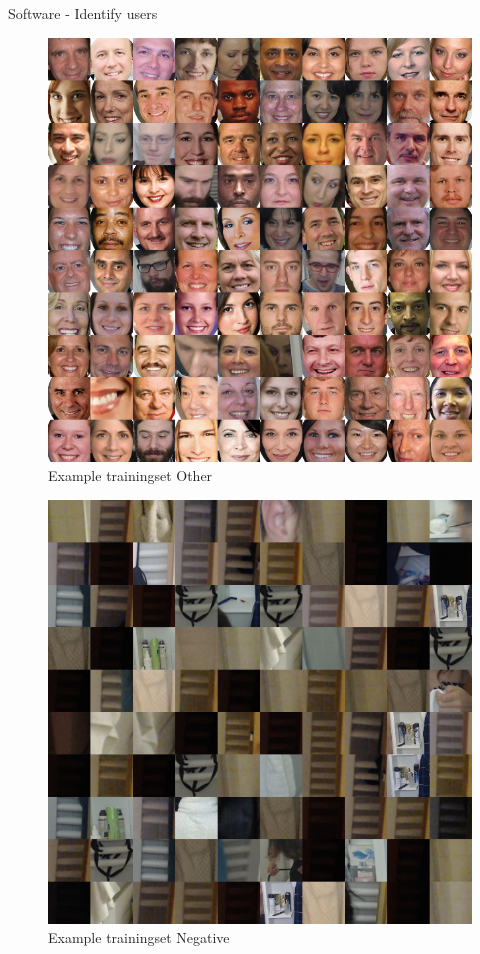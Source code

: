 \documentclass[xcolor=svgnames,handout,aspectratio=169]{beamer}
\begin{document}
\begin{frame}
	{Software - Identify users}
	\parbox{0.45\linewidth}{
	\begin{figure}
	\includegraphics[width=\linewidth]{images/mosaic.png}
	\caption{Example trainingset Other}
	\end{figure}
	}
	\parbox{0.45\linewidth}{	
	\begin{figure}
	\includegraphics[width=\linewidth]{images/mosaic_negative.png}
	\caption{Example trainingset Negative}	
	\end{figure}
	}
\end{frame}
\end{document}
